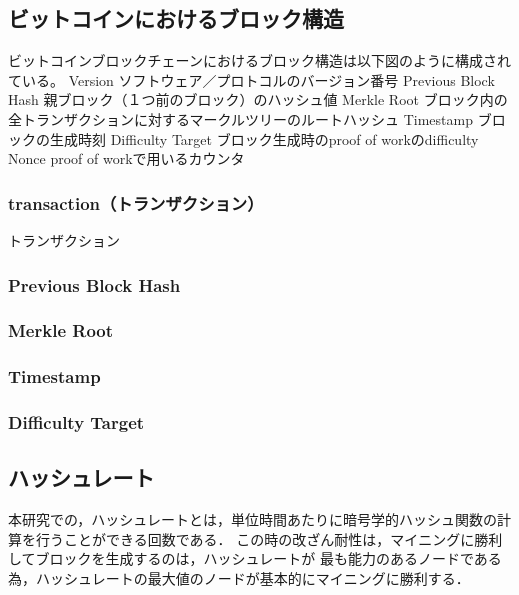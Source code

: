 \documentclass[a4paper,12pt]{jsarticle}
\begin{document}


\subsection{ビットコインにおけるブロック構造}
ビットコインブロックチェーンにおけるブロック構造は以下図のように構成されている。
	Version	ソフトウェア／プロトコルのバージョン番号
	Previous Block Hash	親ブロック（１つ前のブロック）のハッシュ値
	Merkle Root	ブロック内の全トランザクションに対するマークルツリーのルートハッシュ
	Timestamp	ブロックの生成時刻
	Difficulty Target	ブロック生成時のproof of workのdifficulty
	Nonce	proof of workで用いるカウンタ


            \subsubsection{transaction（トランザクション）}
トランザクション
            \subsubsection{Previous Block Hash}
            \subsubsection{Merkle Root}
            \subsubsection{Timestamp}
            \subsubsection{Difficulty Target}



      \subsection{ハッシュレート}
本研究での，ハッシュレートとは，単位時間あたりに暗号学的ハッシュ関数の計算を行うことができる回数である．
この時の改ざん耐性は，マイニングに勝利してブロックを生成するのは，ハッシュレートが
最も能力のあるノードである為，ハッシュレートの最大値のノードが基本的にマイニングに勝利する．
\end{document}
